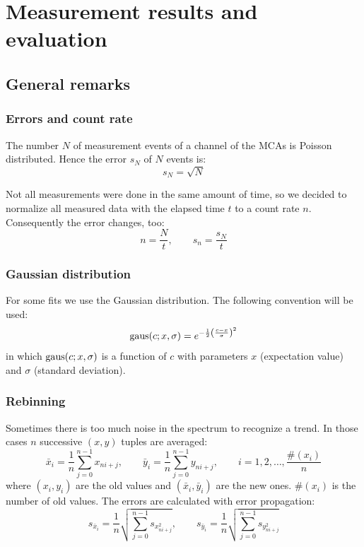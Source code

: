 \section{Measurement results and evaluation}

\subsection{General remarks}
\subsubsection{Errors and count rate}
\label{subsub:errorcountrate}
The number $N$ of measurement events of a channel of the MCAs is Poisson distributed. Hence the error $s_N$  of $N$ events is:
\begin{equation}
  s_N = \sqrt{N}
\end{equation}

Not all measurements were done in the same amount of time, so we decided to normalize all measured data with the elapsed time $t$ to a 
count rate $n$. Consequently the error changes, too:
\begin{equation}
    n = \frac{N}{t}, \qquad s_n = \frac{s_N}{t}
\end{equation}
\subsubsection{Gaussian distribution}
For some fits we use the Gaussian distribution. The following convention will be used:
\begin{equation}
	\label{eq:gaus}
    \operatorname{gaus}(c;x,\sigma) = e^{-\frac{1}{2} \left( \frac{c-x}{\sigma} \right)^2}
\end{equation}
in which $\operatorname{gaus}(c;x,\sigma)$ is a function of $c$ with parameters $x$ (expectation value) and $\sigma$ (standard deviation).

\subsubsection{Rebinning}
\label{subsub:rebinning}
Sometimes there is too much noise in the spectrum to recognize a trend. In those cases $n$ successive $(x, y)$ tuples are averaged:
\begin{equation}
    \bar{x}_i = \frac{1}{n} \sum_{j=0}^{n-1} x_{ni+j}, \qquad \bar{y}_i = \frac{1}{n} \sum_{j=0}^{n-1} y_{ni+j}, \qquad i = 1, 2, \ldots, \frac{\#(x_i)}{n}
\end{equation}
where $(x_i, y_i)$ are the old values and $(\bar{x}_i, \bar{y}_i)$ are the new ones. $\#(x_i)$ is the number of old values.
The errors are calculated with error propagation:
\begin{equation}
    s_{\bar{x}_i} = \frac{1}{n} \sqrt{\sum_{j=0}^{n-1} s_{x_{ni+j}^2}}, \qquad s_{\bar{y}_i} = \frac{1}{n} \sqrt{\sum_{j=0}^{n-1} s_{y_{ni+j}^2}}
\end{equation}


